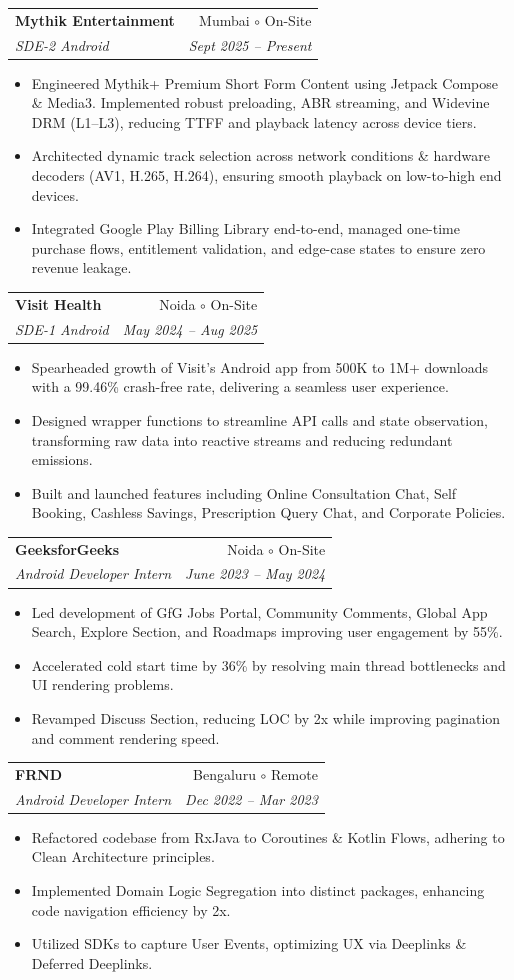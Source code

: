 \documentclass[apaper,10pt]{article}
\makeatletter
\newcommand{\resumeSubheading}[4]{
  \vspace{-1pt}\item
    \begin{tabular*}{0.97\textwidth}{l@{\extracolsep{\fill}}r}
      \textbf{#1} & #2 \\
      \textit{\small#3} & \textit{\small #4} \\
    \end{tabular*}\vspace{-5pt}
}
\newcommand{\resumeItemListStart}{\begin{itemize}[topsep=0pt,itemsep=-1pt]}
\newcommand{\resumeItemListEnd}{\end{itemize}\vspace{-4pt}}
\makeatother
\begin{document}
\resumeSubheading
  {Mythik Entertainment}{Mumbai $\circ$ On-Site}
  {SDE-2 Android}{Sept 2025 -- Present}
  \vspace{4pt}
\resumeItemListStart
  \item\small{Engineered Mythik+ Premium Short Form Content using Jetpack Compose \& Media3. Implemented robust preloading, ABR streaming, and Widevine DRM (L1--L3), reducing TTFF and playback latency across device tiers.}
  \item\small{Architected dynamic track selection across network conditions \& hardware decoders (AV1, H.265, H.264), ensuring smooth playback on low-to-high end devices.}
  \item\small{Integrated Google Play Billing Library end-to-end, managed one-time purchase flows, entitlement validation, and edge-case states to ensure zero revenue leakage.}
\resumeItemListEnd
\vspace{4pt}
\resumeSubheading
  {Visit Health}{Noida $\circ$ On-Site}
  {SDE-1 Android}{May 2024 -- Aug 2025}
  \vspace{4pt}
\resumeItemListStart
  \item\small{Spearheaded growth of Visit's Android app from 500K to 1M+ downloads with a 99.46\% crash-free rate, delivering a seamless user experience.}
  \item\small{Designed wrapper functions to streamline API calls and state observation, transforming raw data into reactive streams and reducing redundant emissions.}
  \item\small{Built and launched features including Online Consultation Chat, Self Booking, Cashless Savings, Prescription Query Chat, and Corporate Policies.}
\resumeItemListEnd
\vspace{4pt}
\resumeSubheading
  {GeeksforGeeks}{Noida $\circ$ On-Site}
  {Android Developer Intern}{June 2023 -- May 2024}
  \vspace{4pt}
\resumeItemListStart
  \item\small{Led development of GfG Jobs Portal, Community Comments, Global App Search, Explore Section, and Roadmaps improving user engagement by 55\%.}
  \item\small{Accelerated cold start time by 36\% by resolving main thread bottlenecks and UI rendering problems.}
  \item\small{Revamped Discuss Section, reducing LOC by 2x while improving pagination and comment rendering speed.}
\resumeItemListEnd
\vspace{4pt}
\resumeSubheading
  {FRND}{Bengaluru $\circ$ Remote}
  {Android Developer Intern}{Dec 2022 -- Mar 2023}
  \vspace{4pt}
\resumeItemListStart
  \item\small{Refactored codebase from RxJava to Coroutines \& Kotlin Flows, adhering to Clean Architecture principles.}
  \item\small{Implemented Domain Logic Segregation into distinct packages, enhancing code navigation efficiency by 2x.}
  \item\small{Utilized SDKs to capture User Events, optimizing UX via Deeplinks \& Deferred Deeplinks.}
\resumeItemListEnd
\end{document}
